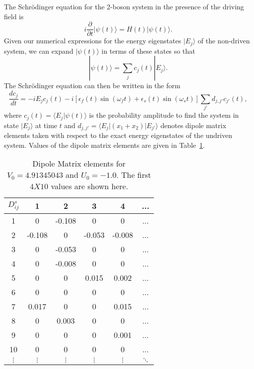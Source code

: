 The  Schr\"{o}dinger equation for the 2-boson system in the presence of the driving field is
%
\begin{equation}
i\frac{\partial}{\partial t}\vert \psi(t)\rangle=H(t)\vert \psi(t)\rangle .
\end{equation}
%
Given our numerical expressions for the energy eigenstates $|E_j{\rangle}$ of the non-driven  system, we can expand $|\psi(t)\rangle$ in terms of these states so that
%
\begin{equation}
|\psi(t)\rangle = \sum_jc_j(t) |E_j\rangle.
\end{equation}
%
The Schr\"odinger equation can then be written in the form
%
\begin{equation}
\frac{dc_j}{dt} =-iE_jc_j(t)-i[ \epsilon_f(t) \sin(\omega_ft) 
+\epsilon_s(t) \sin(\omega_st)] \sum_{j'}d_{j,j'}c_{j'}(t),
\label{eq:schroedinger}
\end{equation}
%
where $c_j(t)=\langle E_j|\psi(t)\rangle$ is the probability amplitude to find the system in state $|E_j\rangle$ at time $t$ and $d_{j,j'}={\langle}E_j|(x_1+x_2)|E_{j'}{\rangle}$ denotes dipole matrix elements taken with respect to the exact energy eigenstates of the undriven system. Values of the dipole matrix elements are given in Table~\ref{tabA}.

\begin{table}
\begin{center}
\begin{tabular}{|c|ccccc}
$D^s_{ij}$ & 1& 2& 3& 4& ...\\
\hline
1& 0& -0.108& 0& 0& ...\\
2& -0.108& 0& -0.053& -0.008&  ...\\
3& 0& -0.053& 0& 0&... \\
4& 0& -0.008& 0& 0&   ... \\
5& 0& 0& 0.015& 0.002&   ... \\
6& 0& 0& 0& 0&   ... \\
7& 0.017& 0& 0& 0.015&  ... \\
8& 0& 0.003& 0& 0&   ...\\
9& 0& 0& 0& 0.001& ... \\
10& 0& 0& 0& 0&   ... \\
$\vdots$& $\vdots$& $\vdots$& $\vdots$& $\vdots$& $\ddots$\\
\end{tabular}
\caption{Dipole Matrix elements for $V_0=4.91345043$ and $U_0=-1.0$. The first $4 X 10$ values are shown here. }
\label{tabA}
\end{center}
\end{table}
%
